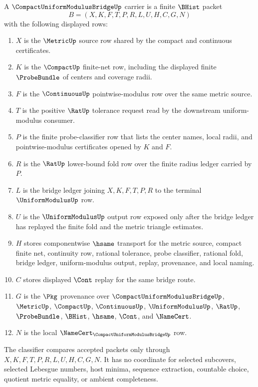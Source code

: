 \begin{definition}
\label{def:compact-uniform-modulus-bridge-carrier}
A $\CompactUniformModulusBridgeUp$ carrier is a finite $\BHist$ packet
$$
B=(X,K,F,T,P,R,L,U,H,C,G,N)
$$
with the following displayed rows:
\begin{enumerate}
\item $X$ is the $\MetricUp$ source row shared by the compact and continuous certificates.
\item $K$ is the $\CompactUp$ finite-net row, including the displayed finite $\ProbeBundle$ of centers and coverage radii.
\item $F$ is the $\ContinuousUp$ pointwise-modulus row over the same metric source.
\item $T$ is the positive $\RatUp$ tolerance request read by the downstream uniform-modulus consumer.
\item $P$ is the finite probe-classifier row that lists the center names, local radii, and pointwise-modulus certificates opened by $K$ and $F$.
\item $R$ is the $\RatUp$ lower-bound fold row over the finite radius ledger carried by $P$.
\item $L$ is the bridge ledger joining $X,K,F,T,P,R$ to the terminal $\UniformModulusUp$ row.
\item $U$ is the $\UniformModulusUp$ output row exposed only after the bridge ledger has replayed the finite fold and the metric triangle estimates.
\item $H$ stores componentwise $\hsame$ transport for the metric source, compact finite net, continuity row, rational tolerance, probe classifier, rational fold, bridge ledger, uniform-modulus output, replay, provenance, and local naming.
\item $C$ stores displayed $\Cont$ replay for the same bridge route.
\item $G$ is the $\Pkg$ provenance over $\CompactUniformModulusBridgeUp$, $\MetricUp$, $\CompactUp$, $\ContinuousUp$, $\UniformModulusUp$, $\RatUp$, $\ProbeBundle$, $\BHist$, $\hsame$, $\Cont$, and $\NameCert$.
\item $N$ is the local $\NameCert_{\CompactUniformModulusBridgeUp}$ row.
\end{enumerate}
The classifier compares accepted packets only through $X,K,F,T,P,R,L,U,H,C,G,N$. It has no coordinate for selected subcovers, selected Lebesgue numbers, host minima, sequence extraction, countable choice, quotient metric equality, or ambient completeness.
\end{definition}

